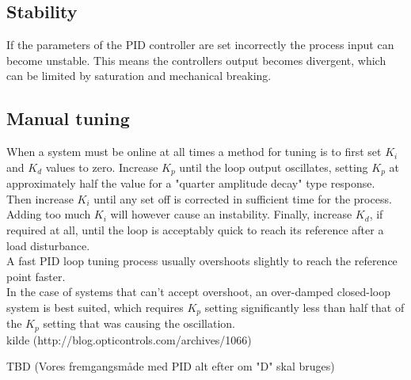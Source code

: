 \subsection {Stability} 

If the parameters of the PID controller are set incorrectly the process input can become unstable.
This means the controllers output becomes divergent, which can be limited by saturation and mechanical breaking. \\

\subsection {Manual tuning} 

When a system must be online at all times a method for tuning is to first set $K_i$ and $K_d$ values to zero. Increase $K_p$ until the loop output oscillates, setting $K_p$ at approximately half the value for a "quarter amplitude decay" type response.\\ 
Then increase $K_i$ until any set off is corrected in sufficient time for the process. Adding too much $K_i$ will however cause an instability. 
Finally, increase $K_d$, if required at all, until the loop is acceptably quick to reach its reference after a load disturbance.
\\ 
A fast PID loop tuning process usually overshoots slightly to reach the reference point faster.\\ %
In the case of systems that can't accept overshoot, an over-damped closed-loop system is best suited, which requires $K_p$ setting significantly less than half that of the $K_p$ setting that was causing the oscillation.
\\ kilde (http://blog.opticontrols.com/archives/1066)

TBD (Vores fremgangsmåde med PID alt efter om "D" skal bruges)


